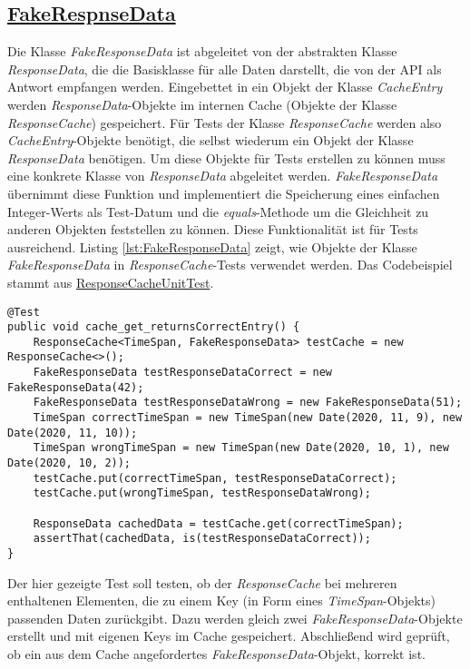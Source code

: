 \newpage
\subsection*{\href{https://github.com/lukaspanni/OpenSourceStats/blob/main/app/src/test/java/de/lukaspanni/opensourcestats/mock/FakeResponseData.java}{FakeRespnseData}}
Die Klasse \textit{FakeResponseData} ist abgeleitet von der abstrakten Klasse \textit{ResponseData}, die die Basisklasse für alle Daten darstellt, die von der API als Antwort empfangen werden. Eingebettet in ein Objekt der Klasse \textit{CacheEntry} werden \textit{ResponseData}-Objekte im internen Cache (Objekte der Klasse \textit{ResponseCache}) gespeichert.
\newline
Für Tests der Klasse \textit{ResponseCache} werden also \textit{CacheEntry}-Objekte benötigt, die selbst wiederum ein Objekt der Klasse \textit{ResponseData} benötigen.
Um diese Objekte für Tests erstellen zu können muss eine  konkrete Klasse von \textit{ResponseData} abgeleitet werden. \textit{FakeResponseData} übernimmt diese Funktion und implementiert die Speicherung eines einfachen Integer-Werts als Test-Datum und die \textit{equals}-Methode um die Gleichheit zu anderen Objekten feststellen zu können.
Diese Funktionalität ist für Tests ausreichend.
\newline
Listing \ref{lst:FakeResponseData} zeigt, wie Objekte der Klasse \textit{FakeResponseData} in \textit{ResponseCache}-Tests verwendet werden. Das Codebeispiel stammt aus \href{https://github.com/lukaspanni/OpenSourceStats/blob/d0f67e73e4692b70316216688b7f556f42ccc11e/app/src/test/java/de/lukaspanni/opensourcestats/ResponseCacheUnitTest.java#L20-L32}{ResponseCacheUnitTest}.
\begin{lstlisting}[caption={Beispielhafte Verwendung von FakeResponseData}, label={lst:FakeResponseData}, captionpos={b}]
@Test
public void cache_get_returnsCorrectEntry() {
    ResponseCache<TimeSpan, FakeResponseData> testCache = new ResponseCache<>();
    FakeResponseData testResponseDataCorrect = new FakeResponseData(42);
    FakeResponseData testResponseDataWrong = new FakeResponseData(51);
    TimeSpan correctTimeSpan = new TimeSpan(new Date(2020, 11, 9), new Date(2020, 11, 10));
    TimeSpan wrongTimeSpan = new TimeSpan(new Date(2020, 10, 1), new Date(2020, 10, 2));
    testCache.put(correctTimeSpan, testResponseDataCorrect);
    testCache.put(wrongTimeSpan, testResponseDataWrong);

    ResponseData cachedData = testCache.get(correctTimeSpan);
    assertThat(cachedData, is(testResponseDataCorrect));
}
\end{lstlisting}
Der hier gezeigte Test soll testen, ob der \textit{ResponseCache} bei mehreren enthaltenen Elementen, die zu einem Key (in Form eines \textit{TimeSpan}-Objekts) passenden Daten zurückgibt.
Dazu werden gleich zwei \textit{FakeResponseData}-Objekte erstellt und mit eigenen Keys im Cache gespeichert. Abschließend wird geprüft, ob ein aus dem Cache angefordertes \textit{FakeResponseData}-Objekt, korrekt ist.